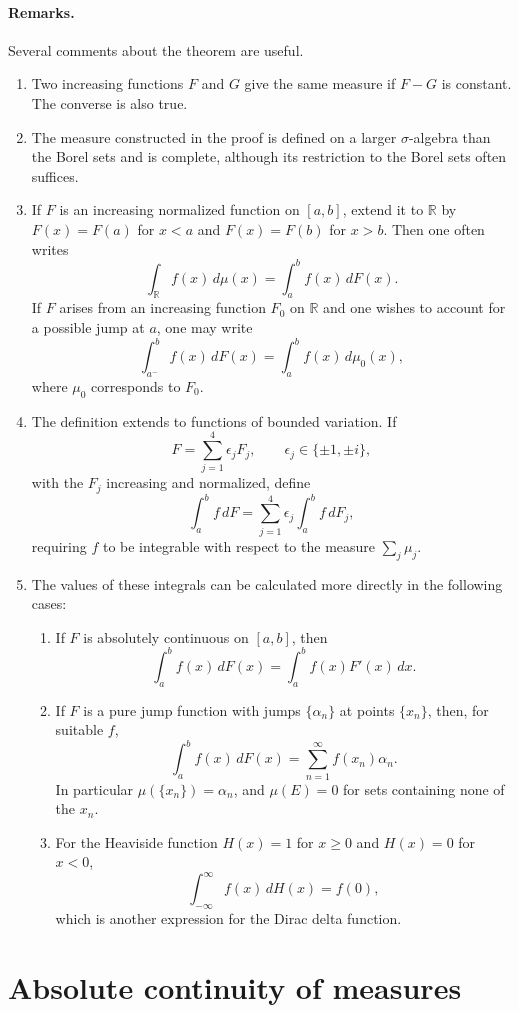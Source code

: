 \documentclass[11pt,openany]{book}
\begin{document}
\paragraph{Remarks.}
Several comments about the theorem are useful.
\begin{enumerate}
\item[(i)] Two increasing functions $F$ and $G$ give the same measure if $F-G$ is constant. The converse is also true.
\item[(ii)] The measure constructed in the proof is defined on a larger $\sigma$-algebra than the Borel sets and is complete, although its restriction to the Borel sets often suffices.
\item[(iii)] If $F$ is an increasing normalized function on $[a,b]$, extend it to $\mathbb R$ by $F(x)=F(a)$ for $x<a$ and $F(x)=F(b)$ for $x>b$. Then one often writes
\[
\int_{\mathbb R}f(x)\,d\mu(x)=\int_a^b f(x)\,dF(x).
\]
If $F$ arises from an increasing function $F_0$ on $\mathbb R$ and one wishes to account for a possible jump at $a$, one may write
\[
\int_{a^-}^b f(x)\,dF(x)=\int_a^b f(x)\,d\mu_0(x),
\]
where $\mu_0$ corresponds to $F_0$.
\item[(iv)] The definition extends to functions of bounded variation. If
\[
F=\sum_{j=1}^4\epsilon_jF_j,
\qquad \epsilon_j\in\{\pm1,\pm i\},
\]
with the $F_j$ increasing and normalized, define
\[
\int_a^b f\,dF=\sum_{j=1}^4\epsilon_j\int_a^b f\,dF_j,
\]
requiring $f$ to be integrable with respect to the measure $\sum_j\mu_j$.
\item[(v)] The values of these integrals can be calculated more directly in the following cases:
\begin{enumerate}
\item[(a)] If $F$ is absolutely continuous on $[a,b]$, then
\[
\int_a^b f(x)\,dF(x)=\int_a^b f(x)F'(x)\,dx.
\]
\item[(b)] If $F$ is a pure jump function with jumps $\{\alpha_n\}$ at points $\{x_n\}$, then, for suitable $f$,
\[
\int_a^b f(x)\,dF(x)=\sum_{n=1}^{\infty}f(x_n)\alpha_n.
\]
In particular $\mu(\{x_n\})=\alpha_n$, and $\mu(E)=0$ for sets containing none of the $x_n$.
\item[(c)] For the Heaviside function $H(x)=1$ for $x\geq0$ and $H(x)=0$ for $x<0$,
\[
\int_{-\infty}^{\infty}f(x)\,dH(x)=f(0),
\]
which is another expression for the Dirac delta function.
\end{enumerate}
\end{enumerate}

\section{Absolute continuity of measures}
\end{document}
